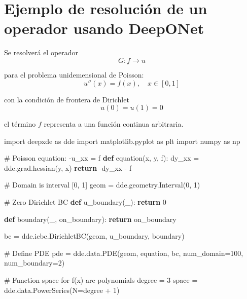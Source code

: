 \documentclass[
  spanish,
  us-letterpaper,
  DIV=11,
  numbers=noendperiod]{scrreprt}
\newenvironment{Shaded}{\begin{snugshade}}{\end{snugshade}}
\newcommand{\CommentTok}[1]{\textcolor[rgb]{0.37,0.37,0.37}{#1}}
\newcommand{\ControlFlowTok}[1]{\textcolor[rgb]{0.00,0.23,0.31}{\textbf{#1}}}
\newcommand{\DecValTok}[1]{\textcolor[rgb]{0.68,0.00,0.00}{#1}}
\newcommand{\ImportTok}[1]{\textcolor[rgb]{0.00,0.46,0.62}{#1}}
\newcommand{\KeywordTok}[1]{\textcolor[rgb]{0.00,0.23,0.31}{\textbf{#1}}}
\newcommand{\NormalTok}[1]{\textcolor[rgb]{0.00,0.23,0.31}{#1}}
\newcommand{\OperatorTok}[1]{\textcolor[rgb]{0.37,0.37,0.37}{#1}}
\theoremstyle{plain}
\theoremstyle{definition}
\theoremstyle{remark}
\begin{document}
\section{Ejemplo de resolución de un operador usando
DeepONet}\label{ejemplo-de-resoluciuxf3n-de-un-operador-usando-deeponet}

Se resolverá el operador \[
G: f\rightarrow u
\]

para el problema unidemensional de Poisson: \[
u''(x) = f(x), \quad x\in[0,1]
\]

con la condición de frontera de Dirichlet \[
u(0)=u(1)=0
\]

el término \(f\) representa a una función continua arbitraria.

\begin{Shaded}
\begin{Highlighting}[]
\ImportTok{import}\NormalTok{ deepxde }\ImportTok{as}\NormalTok{ dde}
\ImportTok{import}\NormalTok{ matplotlib.pyplot }\ImportTok{as}\NormalTok{ plt}
\ImportTok{import}\NormalTok{ numpy }\ImportTok{as}\NormalTok{ np}


\CommentTok{\# Poisson equation: {-}u\_xx = f}
\KeywordTok{def}\NormalTok{ equation(x, y, f):}
\NormalTok{    dy\_xx }\OperatorTok{=}\NormalTok{ dde.grad.hessian(y, x)}
    \ControlFlowTok{return} \OperatorTok{{-}}\NormalTok{dy\_xx }\OperatorTok{{-}}\NormalTok{ f}

\CommentTok{\# Domain is interval [0, 1]}
\NormalTok{geom }\OperatorTok{=}\NormalTok{ dde.geometry.Interval(}\DecValTok{0}\NormalTok{, }\DecValTok{1}\NormalTok{)}

\CommentTok{\# Zero Dirichlet BC}
\KeywordTok{def}\NormalTok{ u\_boundary(\_):}
    \ControlFlowTok{return} \DecValTok{0}

\KeywordTok{def}\NormalTok{ boundary(\_, on\_boundary):}
    \ControlFlowTok{return}\NormalTok{ on\_boundary}

\NormalTok{bc }\OperatorTok{=}\NormalTok{ dde.icbc.DirichletBC(geom, u\_boundary, boundary)}

\CommentTok{\# Define PDE}
\NormalTok{pde }\OperatorTok{=}\NormalTok{ dde.data.PDE(geom, equation, bc, num\_domain}\OperatorTok{=}\DecValTok{100}\NormalTok{, num\_boundary}\OperatorTok{=}\DecValTok{2}\NormalTok{)}

\CommentTok{\# Function space for f(x) are polynomials}
\NormalTok{degree }\OperatorTok{=} \DecValTok{3}
\NormalTok{space }\OperatorTok{=}\NormalTok{ dde.data.PowerSeries(N}\OperatorTok{=}\NormalTok{degree }\OperatorTok{+} \DecValTok{1}\NormalTok{)}


\end{Highlighting}
\end{Shaded}
\end{document}
